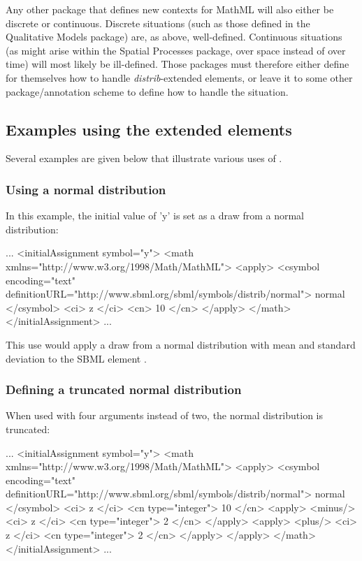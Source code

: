 \documentclass[draftspec]{sbmlpkgspec}
\newcommand{\distribshort}{\emph{distrib}\xspace}
\newcommand{\mathml}{MathML\xspace}
\begin{document}
Any other package that defines new contexts for MathML will also either be discrete or continuous.  Discrete situations (such as those defined in the Qualitative Models package) are, as above, well-defined.  Continuous situations (as might arise within the Spatial Processes package, over space instead of over time) will most likely be ill-defined.  Those packages must therefore either define for themselves how to handle \distribshort-extended \changed{\mathml} elements, or leave it to some other package/annotation scheme to define how to handle the situation.



\begin{blockChanged}
\subsection{Examples using the extended  elements}
\label{sec:cs-examples}

Several examples are given below that illustrate various uses of .

\subsubsection{Using a normal distribution}

In this example, the initial value of 'y' is set as a draw from a normal distribution:

\begin{example}
...
  <initialAssignment symbol="y">
    <math xmlns="http://www.w3.org/1998/Math/MathML">
      <apply>
        <csymbol encoding="text" definitionURL="http://www.sbml.org/sbml/symbols/distrib/normal">
          normal
        </csymbol>
        <ci> z </ci>
        <cn> 10 </cn>
      </apply>
    </math>
  </initialAssignment>
...
\end{example}

This use would apply a draw from a normal distribution with mean  and standard deviation  to the SBML element .

\subsubsection{Defining a truncated normal distribution}

When used with four arguments instead of two, the normal distribution is truncated:

\begin{example}
...
  <initialAssignment symbol="y">
    <math xmlns="http://www.w3.org/1998/Math/MathML">
      <apply>
        <csymbol encoding="text" definitionURL="http://www.sbml.org/sbml/symbols/distrib/normal">
          normal
        </csymbol>
        <ci> z </ci>
        <cn type="integer"> 10 </cn>
        <apply>
          <minus/>
          <ci> z </ci>
          <cn type="integer"> 2 </cn>
        </apply>
        <apply>
          <plus/>
          <ci> z </ci>
          <cn type="integer"> 2 </cn>
        </apply>
      </apply>
    </math>
  </initialAssignment>
...
\end{example}


\end{blockChanged}
\end{document}
